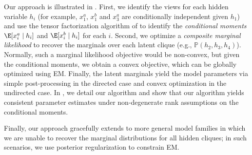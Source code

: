 
Our approach is illustrated in . 
First, we identify the views for each hidden variable $h_i$ (for example,
$x_1^a$, $x_1^b$ and $x_3^a$ are conditionally independent given $h_1$) and use
the tensor factorization algorithm of
\citet{anandkumar12moments,anandkumar13tensor} to identify the \emph{conditional
moments} $\E[x_i^a \mid h_i]$ and $\E[x_i^b \mid h_i]$ for each $i$.
Second, we optimize a \emph{composite marginal likelihood} to recover the marginals over
each latent clique (e.g., $\mathbb P(h_2, h_3, h_4)$).
Normally, such a marginal likelihood objective would be non-convex,
but given the conditional moments, we obtain a convex objective,
which can be globally optimized using EM.
Finally, the latent marginals yield the model parameters
via simple post-processing in the directed case and convex optimization in the undirected case.
In , we detail our algorithm and
show that our algorithm yields consistent parameter estimates
under non-degenerate rank assumptions on the conditional moments.

Finally, our approach gracefully extends to more general model families
  in which we are unable to recover the marginal distributions for all
  hidden cliques; in such scenarios, we use posterior regularization to constrain
  EM.  
